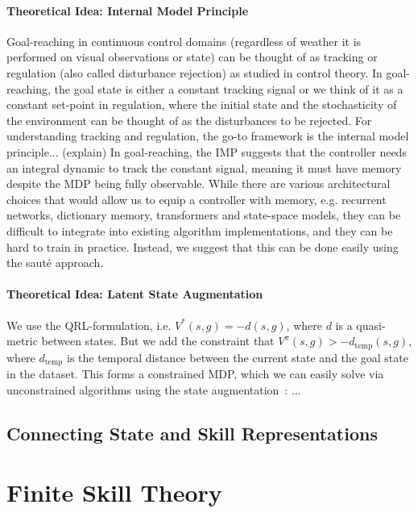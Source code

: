 \documentclass{article}
\theoremstyle{plain}
\theoremstyle{definition}
\theoremstyle{remark}
\begin{document}
\paragraph{Theoretical Idea: Internal Model Principle} Goal-reaching in continuous control domains (regardless of weather it is performed on visual observations or state) can be thought of as tracking or regulation (also called disturbance rejection) as studied in control theory. In goal-reaching, the goal state is either a constant tracking signal or we think of it as a constant set-point in regulation, where the initial state and the stochasticity of the environment can be thought of as the disturbances to be rejected. For understanding tracking and regulation, the go-to framework is the internal model principle... (explain)
In goal-reaching, the IMP suggests that the controller needs an integral dynamic to track the constant signal, meaning it must have memory despite the MDP being fully observable. While there are various architectural choices that would allow us to equip a controller with memory, e.g. recurrent networks, dictionary memory, transformers and state-space models, they can be difficult to integrate into existing algorithm implementations, and they can be hard to train in practice. Instead, we suggest that this can be done easily using the saut\'e approach.

\paragraph{Theoretical Idea: Latent State Augmentation} 
We use the QRL-formulation, i.e. $V^*(s,g) = -d(s,g)$, where $d$ is a quasi-metric between states. But we add the constraint that $V^\pi(s,g)>-d_\mathrm{temp}(s,g)$, where $d_\mathrm{temp}$ is the temporal distance between the current state and the goal state in the dataset. This forms a constrained MDP, which we can easily solve via unconstrained algorithms using the state augmentation~\citep{sootla2022saute}: ...

\subsection{Connecting State and Skill Representations}

\section{Finite Skill Theory}
\end{document}
